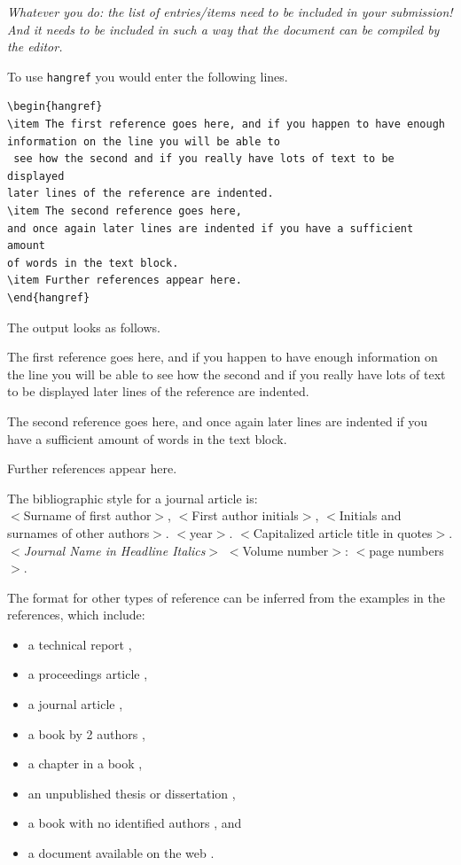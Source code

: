 \documentclass{wscpaperproc}
\theoremstyle{wsc}
\begin{document}
{\em Whatever you do: the list of entries/items need to be included in your submission! And it needs to be included in such a way that the document can be compiled by the editor.}

To use {\tt hangref} you would enter the following lines.\newline


\begin{verbatim}
\begin{hangref}
\item The first reference goes here, and if you happen to have enough
information on the line you will be able to
 see how the second and if you really have lots of text to be displayed
later lines of the reference are indented.
\item The second reference goes here,
and once again later lines are indented if you have a sufficient amount
of words in the text block.
\item Further references appear here.
\end{hangref}
\end{verbatim}\vspace{4mm}

The output looks as follows.
\begin{hangref}
\item The first reference goes here, and if you happen to have enough information
on the line you will be able to
 see how the second and if you really have lots of text to be displayed later
lines of the reference are indented.
\item The second reference goes here,
and once again later lines are indented if you have a sufficient amount of words in the text block.
\item Further references appear here.
\end{hangref}

The bibliographic style for a journal article is: \\
$<$Surname of first author$>$, $<$First author initials$>$,
$<$Initials and surnames of other authors$>$. $<$year$>$.
$<$Capitalized article title in quotes$>$. $<${\em Journal Name in
Headline Italics}$>$ $<$Volume number$>$: $<$page numbers$>$.

The format for other types of reference can be inferred from the examples in the references, which include:
\begin{itemize}
\item a technical report \cite{chi89},
\item a proceedings article \cite{cheng:input94},
\item a journal article \cite{gupta:mnormal},
\item a book by 2 authors \cite{hammersley:montecarlo},
\item a chapter in a book \cite{sch79},
\item an unpublished thesis or dissertation \cite{ste99},
\item a book with no identified authors \cite{chicago03}, and
\item a document available on the web \cite{WSC}.
\end{itemize}
\end{document}

